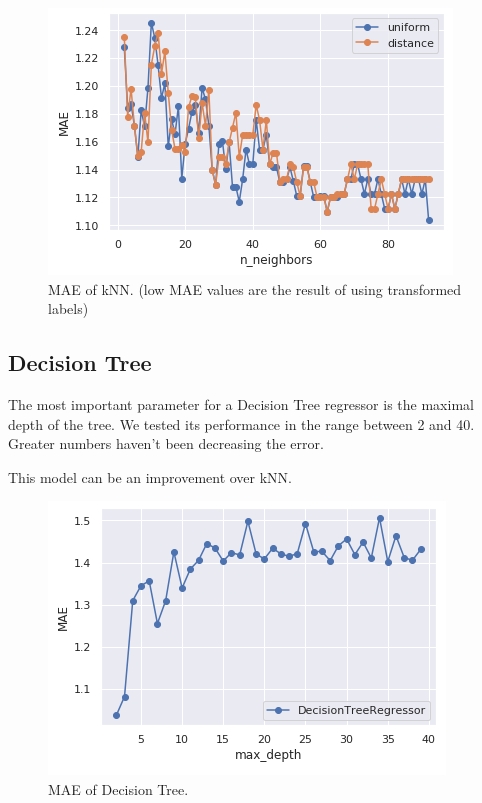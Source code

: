 \documentclass[sigconf]{acmart}
\begin{document}
\begin{figure}[h]
    \includegraphics[width=\linewidth]{1-knn.png}
    \centering
    \caption{MAE of kNN. (low MAE values are the result of using transformed labels)}
\end{figure}

\subsection{Decision Tree}
The most important parameter for a Decision Tree regressor is the maximal depth of the tree.
We tested its performance in the range between 2 and 40.
Greater numbers haven't been decreasing the error.

This model can be an improvement over kNN.

\begin{figure}[h]
    \includegraphics[width=\linewidth]{2-decision-tree.png}
    \centering
    \caption{MAE of Decision Tree.}
\end{figure}
\end{document}
